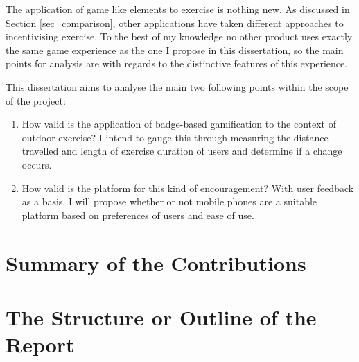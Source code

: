 The application of game like elements to exercise is nothing new. As
discussed in Section \ref{sec_comparison}, other applications have
taken different approaches to incentivising exercise. To the best of
my knowledge no other product uses exactly the same game experience as
the one I propose in this dissertation, so the main points for
analysis are with regards to the distinctive features of this
experience. 

This dissertation aims to analyse the main two following points within
the scope of the project:

\begin{enumerate}
  \item How valid is the application of badge-based gamification to
    the context of outdoor exercise? I intend to gauge this through
    measuring the distance travelled and length of exercise duration
    of users and determine if a change occurs.
  \item How valid is the platform for this kind of encouragement?
    With user feedback as a basis, I will propose whether or not
    mobile phones are a suitable platform based on preferences of
    users and ease of use.
\end{enumerate}

\section{Summary of the Contributions}


\section{The Structure or Outline of the Report}
